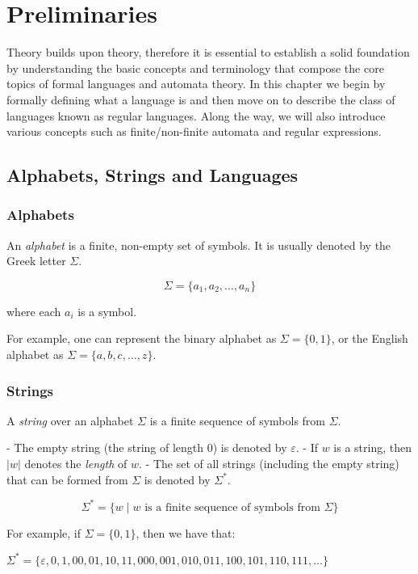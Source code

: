 \chapter{Preliminaries}\label{chap:prelim}
Theory builds upon theory, therefore it is essential to establish a solid foundation by understanding the basic concepts and terminology that compose the core topics of formal languages and automata theory.
In this chapter we begin by formally defining what a language is and then move on to describe the class of languages known as regular languages.
Along the way, we will also introduce various concepts such as finite/non-finite automata and regular expressions.

\section{Alphabets, Strings and Languages}
\subsection*{Alphabets}

An \emph{alphabet} is a finite, non-empty set of symbols. It is usually denoted by the Greek letter $\Sigma$.

\[
\Sigma = \{ a_1, a_2, \dots, a_n \}
\]

where each $a_i$ is a symbol. \newline

For example, one can represent the binary alphabet as $\Sigma = \{ 0, 1 \}$, or the English alphabet as $\Sigma = \{ a, b, c, \ldots, z \}$.

\subsection*{Strings}

A \emph{string} over an alphabet $\Sigma$ is a finite sequence of symbols from $\Sigma$.

- The empty string (the string of length 0) is denoted by $\varepsilon$.
- If $w$ is a string, then $|w|$ denotes the \emph{length} of $w$.
- The set of all strings (including the empty string) that can be formed from $\Sigma$ is denoted by $\Sigma^*$.

\[
\Sigma^* = \{ w \mid w \text{ is a finite sequence of symbols from } \Sigma \}
\]

For example, if $\Sigma = \{ 0, 1 \}$, then we have that:
\begin{center}
	$\Sigma^* = \{ \varepsilon, 0, 1, 00, 01, 10, 11, 000, 001, 010, 011, 100, 101, 110, 111, \ldots \}$
\end{center}


